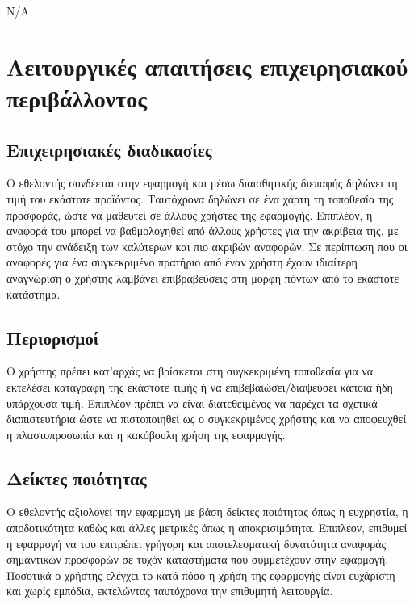 \documentclass[a4paper,oneside, 12pt]{article}
\begin{document}
N/A

\section{Λειτουργικές απαιτήσεις επιχειρησιακού περιβάλλοντος}
\subsection{Επιχειρησιακές διαδικασίες}
Ο εθελοντής συνδέεται στην εφαρμογή και μέσω διαισθητικής διεπαφής δηλώνει 
τη τιμή του εκάστοτε προϊόντος. Ταυτόχρονα δηλώνει σε ένα χάρτη τη τοποθεσία 
της προσφοράς, ώστε να μαθευτεί σε άλλους χρήστες της εφαρμογής. Επιπλέον, η 
αναφορά του μπορεί να βαθμολογηθεί από άλλους χρήστες για την ακρίβεια της, με στόχο την ανάδειξη των καλύτερων και πιο ακριβών αναφορών. Σε περίπτωση που οι αναφορές για ένα συγκεκριμένο πρατήριο από έναν χρήστη έχουν ιδιαίτερη αναγνώριση ο χρήστης λαμβάνει επιβραβεύσεις στη μορφή πόντων από το εκάστοτε κατάστημα.

\subsection{Περιορισμοί}

Ο χρήστης πρέπει κατ’αρχάς να βρίσκεται στη συγκεκριμένη τοποθεσία για να εκτελέσει καταγραφή της εκάστοτε τιμής ή να επιβεβαιώσει/διαψεύσει κάποια ήδη υπάρχουσα τιμή. Επιπλέον πρέπει να είναι διατεθειμένος να παρέχει τα σχετικά διαπιστευτήρια ώστε να πιστοποιηθεί ως ο συγκεκριμένος χρήστης και να αποφευχθεί η πλαστοπροσωπία και η κακόβουλη χρήση της εφαρμογής.

\subsection{Δείκτες ποιότητας}
Ο εθελοντής αξιολογεί την εφαρμογή με βάση δείκτες ποιότητας όπως η ευχρηστία, η αποδοτικότητα καθώς και άλλες μετρικές όπως η αποκρισιμότητα. Επιπλέον, επιθυμεί η εφαρμογή να του επιτρέπει γρήγορη και αποτελεσματική δυνατότητα αναφοράς σημαντικών προσφορών σε τυχόν καταστήματα που συμμετέχουν στην εφαρμογή. Ποσοτικά ο χρήστης ελέγχει το κατά πόσο η χρήση της εφαρμογής είναι ευχάριστη και χωρίς εμπόδια, εκτελώντας ταυτόχρονα την επιθυμητή λειτουργία.
\end{document}
